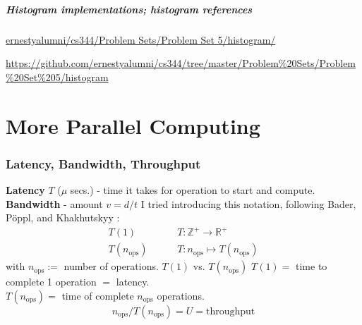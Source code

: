 \documentclass[10pt]{amsart}
\begin{document}
\begin{multicols*}{2}
\subsubsection{Histogram implementations; histogram references}

\href{https://github.com/ernestyalumni/cs344/tree/master/Problem%20Sets/Problem%20Set%205/histogram}{ernestyalumni/cs344/Problem Sets/Problem Set 5/histogram/}

  \url{https://github.com/ernestyalumni/cs344/tree/master/Problem%20Sets/Problem%20Set%205/histogram}


\part{More Parallel Computing}
\section{Latency, Bandwidth, Throughput}
\textbf{Latency} $T$ ($\mu$ secs.) - time it takes for operation to start and compute.   
\textbf{Bandwidth} - amount $v=d/t$
I tried introducing this notation, following Bader, P\"{o}ppl, and Khakhutskyy \cite{BaPK2016}  
: \[
\begin{aligned}
T(1) & \qquad \, T:\mathbb{Z}^+ \to \mathbb{R}^+ \\
T(n_{\text{ops}}) & \qquad \, T: n_{\text{ops}} \mapsto T(n_{\text{ops}})
\end{aligned}
\]
with $n_{\text{ops}} := $ number of operations.  
$T(1)$ vs. $T(n_{\text{ops}})$  
$T(1) = $ time to complete 1 operation $= $ latency.  \\
$T(n_{\text{ops}}) = $ time of complete $n_{\text{ops}}$ operations. 
\begin{equation}
n_{\text{ops}} / T(n_{\text{ops}}) = U = \text{throughput}
\end{equation}

\end{multicols*}
\end{document}
